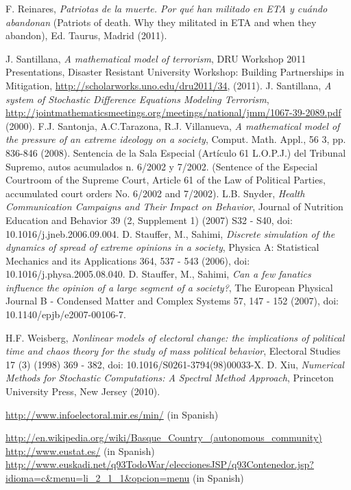 \documentclass[12pt,a4paper]{report}
\begin{document}
\begin{thebibliography}{99}
 F. Reinares, \textit{Patriotas de la muerte. Por qu\'e han militado en ETA y cu\'ando abandonan} (Patriots of death. Why they militated in ETA and when they abandon), Ed. Taurus, Madrid (2011).

 J. Santillana, \textit{A mathematical model of terrorism}, DRU Workshop 2011 Presentations, Disaster Resistant University Workshop: Building Partnerships in Mitigation, \url{http://scholarworks.uno.edu/dru2011/34}, (2011).
 J. Santillana, \textit{A system of Stochastic Difference Equations Modeling Terrorism}, \url{http://jointmathematicsmeetings.org/meetings/national/jmm/1067-39-2089.pdf} (2000).
 F.J. Santonja, A.C.Tarazona, R.J. Villanueva, \textit{A mathematical model of the pressure of an extreme ideology on a society}, Comput. Math. Appl., 56 3, pp. 836-846 (2008).
 Sentencia de la Sala Especial (Art\'{i}culo 61 L.O.P.J.) del Tribunal Supremo, autos acumulados n. 6/2002 y 7/2002. (Sentence of the Especial Courtroom of the Supreme Court, Article 61 of the Law of Political Parties, accumulated court orders No. 6/2002 and 7/2002).
 L.B. Snyder, \textit{Health Communication Campaigns and Their Impact on Behavior}, Journal of Nutrition Education and Behavior 39 (2, Supplement 1) (2007) S32 - S40, doi: 10.1016/j.jneb.2006.09.004.
 D. Stauffer, M., Sahimi, \textit{Discrete simulation of the dynamics of spread of extreme opinions in a society}, Physica A: Statistical Mechanics and its Applications 364, 537 - 543 (2006), doi: 10.1016/j.physa.2005.08.040.
 D. Stauffer, M., Sahimi, \textit{Can a few fanatics influence the opinion of a large segment of a society?}, The European Physical Journal B - Condensed Matter and Complex Systems 57, 147 - 152 (2007), doi: 10.1140/epjb/e2007-00106-7.

 H.F. Weisberg, \textit{Nonlinear models of electoral change: the implications of political time and chaos theory for the study of mass political behavior}, Electoral Studies 17 (3) (1998) 369 - 382, doi: 10.1016/S0261-3794(98)00033-X.
 D. Xiu, \textit{Numerical Methods for Stochastic Computations: A Spectral Method Approach}, Princeton University Press, New Jersey (2010).

 \url{http://www.infoelectoral.mir.es/min/} (in Spanish)

 \url{http://en.wikipedia.org/wiki/Basque_Country_(autonomous_community)}
 \url{http://www.eustat.es/} (in Spanish)
 \url{http://www.euskadi.net/q93TodoWar/eleccionesJSP/q93Contenedor.jsp?idioma=c&menu=li_2_1_1&opcion=menu} (in Spanish)


\end{thebibliography}
\end{document}
